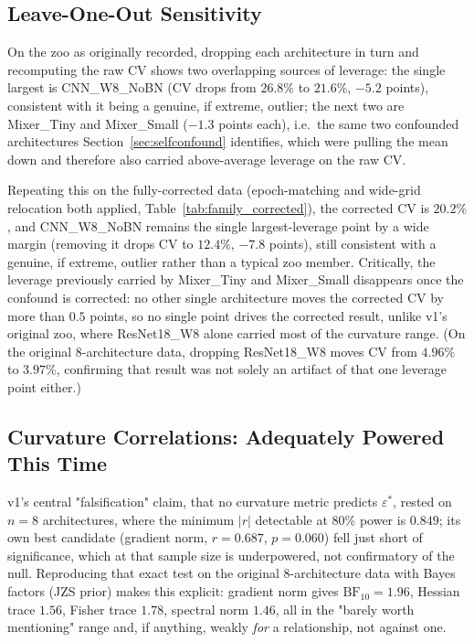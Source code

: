 \documentclass[11pt]{article}
\newcommand{\eps}{\varepsilon}
\newcommand{\epsstar}{\eps^{*}}
\begin{document}
\subsection{Leave-One-Out Sensitivity}
\label{sec:leaveoneout}
On the zoo as originally recorded, dropping each architecture in turn and
recomputing the raw CV shows two overlapping sources of leverage: the single
largest is CNN\_W8\_NoBN (CV drops from $26.8\%$ to $21.6\%$, $-5.2$ points),
consistent with it being a genuine, if extreme, outlier; the next two are
Mixer\_Tiny and Mixer\_Small ($-1.3$ points each), i.e.\ the same two
confounded architectures Section~\ref{sec:selfconfound} identifies, which
were pulling the mean down and therefore also carried above-average
leverage on the raw CV.

Repeating this on the fully-corrected data (epoch-matching and wide-grid
relocation both applied, Table~\ref{tab:family_corrected}), the corrected
CV is $20.2\%$, and CNN\_W8\_NoBN remains the single largest-leverage point
by a wide margin (removing it drops CV to $12.4\%$, $-7.8$ points), still
consistent with a genuine, if extreme, outlier rather than a typical zoo
member. Critically, the leverage previously carried by Mixer\_Tiny and
Mixer\_Small disappears once the confound is corrected: no other single
architecture moves the corrected CV by more than $0.5$ points, so no single
point drives the corrected result, unlike v1's original zoo, where
ResNet18\_W8 alone carried most of the curvature range. (On the original
8-architecture data, dropping ResNet18\_W8 moves CV from $4.96\%$ to
$3.97\%$, confirming that result was not solely an artifact of that one
leverage point either.)

\subsection{Curvature Correlations: Adequately Powered This Time}
v1's central "falsification" claim, that no curvature metric predicts
$\epsstar$, rested on $n=8$ architectures, where the minimum $|r|$
detectable at 80\% power is $0.849$; its own best candidate (gradient norm,
$r=0.687$, $p=0.060$) fell just short of significance, which at that sample
size is underpowered, not confirmatory of the null. Reproducing that exact
test on the original 8-architecture data with Bayes factors (JZS prior)
makes this explicit: gradient norm gives $\mathrm{BF}_{10}=1.96$, Hessian
trace $1.56$, Fisher trace $1.78$, spectral norm $1.46$, all in the
"barely worth mentioning" range and, if anything, weakly \emph{for} a
relationship, not against one.
\end{document}
